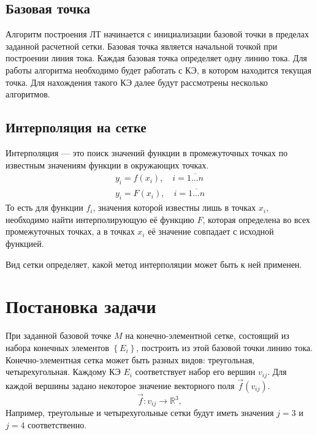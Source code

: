 \subsection{Базовая точка}
Алгоритм построения ЛТ начинается с инициализации базовой точки в пределах заданной расчетной сетки. Базовая точка является начальной точкой при построении линия тока. Каждая базовая точка определяет одну линию тока. Для работы алгоритма необходимо будет работать с КЭ, в котором находится текущая точка. Для нахождения такого КЭ далее будут рассмотрены несколько алгоритмов.

\subsection{Интерполяция на сетке}
Интерполяция --- это поиск значений функции в промежуточных точках по известным значениям функции в окружающих точках.
\begin{align*}
	y_i = f(x_i),\quad i=\overline{1\dots n}\\
	y_i = F(x_i),\quad i=\overline{1\dots n}
\end{align*}
То есть для функции $f_i$, значения которой известны лишь в точках $x_i$, необходимо найти интерполирующую её функцию $F$, которая определена во всех промежуточных точках, а в точках $x_i$ её значение совпадает с исходной функцией.

Вид сетки определяет, какой метод интерполяции может быть к ней применен.
\section{Постановка задачи}
При заданной базовой точке $M$ на конечно-элементной сетке, состоящий из набора конечных элементов $\left\{E_i\right\}$, построить из этой базовой точки линию тока. Конечно-элементная сетка может быть разных видов: треугольная, четырехугольная. Каждому КЭ $E_i$ соответствует набор его вершин $v_{ij}$. Для каждой вершины задано некоторое значение векторного поля $\vec{f}\left(v_{ij}\right)$.
\begin{equation*}
	\vec{f}: v_{ij} \to \mathbb{R}^3,
\end{equation*}
Например, треугольные и четырехугольные сетки будут иметь значения $j=3$ и $j=4$ соответственно.


